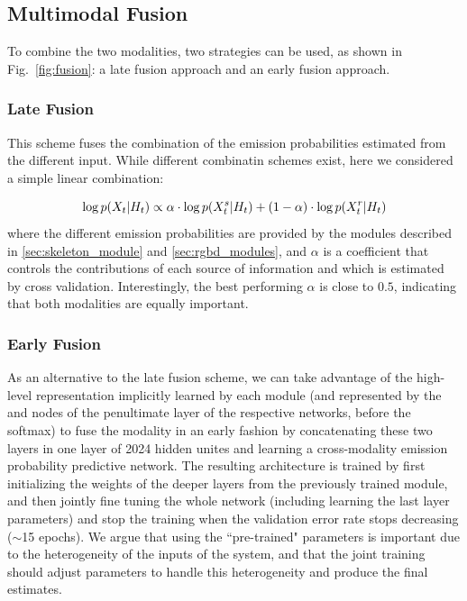 \subsection{Multimodal Fusion}
To combine the two modalities, two strategies can be used, as shown in Fig.~\ref{fig:fusion}:
a late fusion approach and an early fusion approach.


\subsubsection{Late Fusion}
%
This scheme fuses the combination of the emission probabilities estimated from the different input.
While different combinatin schemes exist, here we considered a simple linear combination:

\begin{equation}
\log p(X_t | H_t)  \propto  \alpha \cdot \log p(X_t^s | H_t) + (1-\alpha)\cdot \log p(X_t^r | H_t)
\end{equation}
where the different emission probabilities are provided by the modules described in \ref{sec:skeleton_module} and \ref{sec:rgbd_modules},
and $\alpha$ is a coefficient that controls the contributions of each source of information and which is estimated by cross validation.
Interestingly, the best performing $\alpha$ is close to $0.5$, indicating that both modalities are equally important.


\subsubsection{Early Fusion}
\label{early_fusion}

As an alternative to the late fusion scheme, we can take advantage of the high-level representation implicitly learned by each module
(and represented by the \highSK and \highRGBD nodes of the penultimate layer of the respective networks, before the softmax)
to fuse the modality in an early fashion by concatenating these two layers in one layer of 2024 hidden unites
and learning a cross-modality emission probability predictive network.
%
The resulting architecture is trained by first initializing the weights of the deeper layers from the previously trained module,
and then jointly fine tuning the whole network (including learning the last layer parameters)
and stop the training when the validation error rate stops decreasing ($\sim$15 epochs).
%
We argue that using the ``pre-trained" parameters is important due to the heterogeneity of the inputs of the system,
and that the joint training should adjust parameters to handle  this heterogeneity and produce the final estimates.


